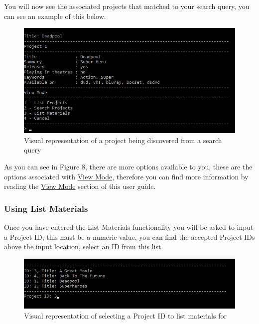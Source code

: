 \documentclass[
  english,
  a4paper,
,tablecaptionabove
]{scrartcl}
\begin{document}
You will now see the associated projects that matched to your search
query, you can see an example of this below.

\begin{figure}
\centering
\includegraphics{images/user-guide/view-mode/project-search-term.png}
\caption{Visual representation of a project being discovered from a
search query}
\end{figure}

As you can see in Figure 8, there are more options available to you,
these are the options associated with
\protect\hyperlink{using-view-mode}{View Mode}, therefore you can find
more information by reading the \protect\hyperlink{using-view-mode}{View
Mode} section of this user guide.

\newpage

\hypertarget{using-list-materials}{%
\subsubsection{Using List Materials}\label{using-list-materials}}

Once you have entered the List Materials functionality you will be asked
to input a Project ID, this must be a numeric value, you can find the
accepted Project IDs above the input location, select an ID from this
list.

\begin{figure}
\centering
\includegraphics{images/user-guide/view-mode/list-materials-project-id.png}
\caption{Visual representation of selecting a Project ID to list
materials for}
\end{figure}
\end{document}
